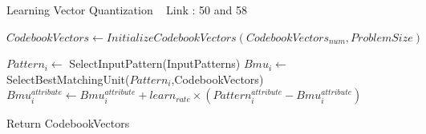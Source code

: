 \documentclass[a4paper]{article}
\begin{document}
  \begin{algorithm}
   \caption{Learning Vector Quantization ~\cite{learningvector3} Link : 50 and 58}
    \begin{algorithmic}[1]
     \State $CodebookVectors \leftarrow InitializeCodebookVectors(CodebookVectors_{num},ProblemSize) $
     
    
            \State $Pattern_i \leftarrow$ SelectInputPattern(InputPatterns)
            \State $Bmu_i \leftarrow$ SelectBestMatchingUnit($Pattern_i$,CodebookVectors)
            \State $Bmu_i^{attribute} \leftarrow Bmu_i^{attribute} + learn_{rate} \times (Pattern_i ^{attribute} - Bmu_i ^{attribute})  $
            \EndIf 
            \EndFor  
        \EndFor
        
       
       \State Return CodebookVectors



 

\end{algorithmic}
\end{algorithm}
\end{document}
